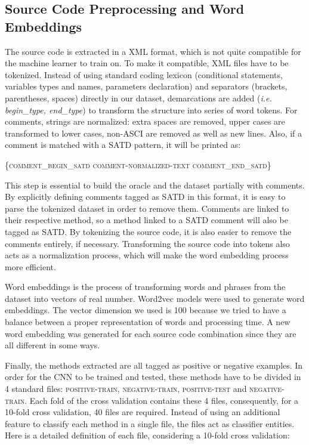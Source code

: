 \subsection{Source Code Preprocessing and Word Embeddings}


The source code is extracted in a XML format, which is not quite compatible for the machine learner to train on. To make it compatible, XML files have to be tokenized. Instead of using standard coding lexicon (conditional statements, variables types and names, parameters declaration) and separators (brackets, parentheses, spaces) directly in our dataset, demarcations are added (\textit{i.e. begin\_type, end\_type}) to transform the structure into series of word tokens. For comments, strings are normalized: extra spaces are removed, upper cases are transformed to lower cases, non-ASCI are removed as well as new lines. Also, if a comment is matched with a SATD pattern, it will be printed as:

\textsc{\{comment\_begin\_satd    comment-normalized-text    comment\_end\_satd\}}

This step is essential to build the oracle and the dataset partially with comments. By explicitly defining comments tagged as SATD in this format, it is easy to parse the tokenized dataset in order to remove them. Comments are linked to their respective method, so a method linked to a SATD comment will also be tagged as SATD. By tokenizing the source code, it is also easier to remove the comments entirely, if necessary. Transforming the source code into tokens also acts as a normalization process, which will make the word embedding process more efficient.

Word embeddings is the process of transforming words and phrases from the dataset into vectors of real number. Word2vec models were used to generate word embeddings. The vector dimension we used is 100 because we tried to have a balance between a proper representation of words and processing time. A new word embedding was generated for each source code combination since they are all different in some ways.

Finally, the methods extracted are all tagged as positive or negative examples. In order for the CNN to be trained and tested, these methods have to be divided in 4 standard files: \textsc{positive-train}, \textsc{negative-train}, \textsc{positive-test} and \textsc{negative-train}. Each fold of the cross validation contains these 4 files, consequently, for a 10-fold cross validation, 40 files are required. Instead of using an additional feature to classify each method in a single file, the files act as classifier entities. Here is a detailed definition of each file, considering a 10-fold cross validation:

